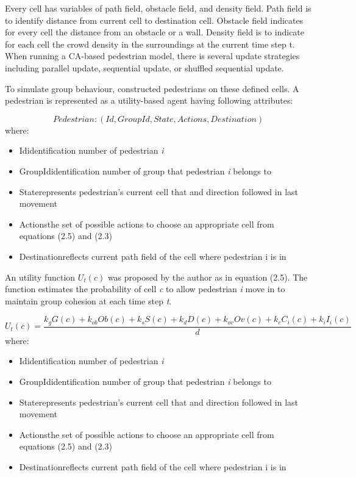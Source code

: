 \documentclass[a4paper,11pt,phdthesis,singlespace,twoside]{cssethesis}
\begin{document}
Every cell has variables of path field, obstacle field, and density field. Path field is to identify distance from current cell to destination cell. Obstacle field indicates for every cell the distance from an obstacle or a wall. Density field is to indicate for each cell the crowd density in the surroundings at the current time step t. When running a CA-based pedestrian model, there is several update strategies including parallel update, sequential update, or shuffled sequential update. 

To simulate group behaviour, \cite{Bandini:2011} constructed pedestrians on these defined cells. A pedestrian is represented as a utility-based agent having following attributes:

\begin{equation}
Pedestrian: (Id,GroupId,State,Actions,Destination)
\end{equation}
where:
\begin{itemize}
  \item Id\textendash identification number of pedestrian \textit{i}
  \item GroupId\textendash identification number of group that pedestrian \textit{i} belongs to
  \item State\textendash represents pedestrian’s current cell that and direction followed in last movement
	\item Actions\textendash the set of possible actions to choose an appropriate cell from equations (2.5) and (2.3)
	\item Destination\textendash reflects current path field of the cell where pedestrian i is in
\end{itemize}

An utility function \begin{math}U_{t}(c)\end{math}  was proposed by the author as in equation (2.5). The function estimates the probability of cell \textit{c} to allow pedestrian \textit{i} move in to maintain group cohesion at each time step \textit{t}.

\begin{equation}
U_{t}(c)= \frac{k_{g}G(c)+k_{ob}Ob(c)+k_{s}S(c)+k_{d}D(c)+k_{ov}Ov(c)+k_{c}C_{i}(c)+k_{i}I_{i}(c)}{d}
\end{equation}
where:
\begin{itemize}
  \item Id\textendash identification number of pedestrian \textit{i}
  \item GroupId\textendash identification number of group that pedestrian \textit{i} belongs to
  \item State\textendash represents pedestrian’s current cell that and direction followed in last movement
	\item Actions\textendash the set of possible actions to choose an appropriate cell from equations (2.5) and (2.3)
	\item Destination\textendash reflects current path field of the cell where pedestrian i is in
\end{itemize}
\end{document}
